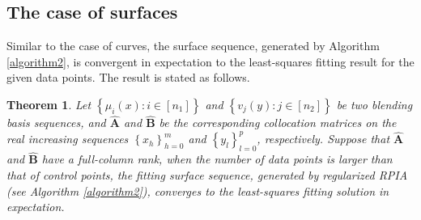 \documentclass[11pt]{article}
\newtheorem{theorem}{Theorem}[section]
\numberwithin{equation}{section}
\begin{document}
\subsection{The case of surfaces}
Similar to the case of curves, the surface sequence, generated by Algorithm \ref{algorithm2}, is convergent in expectation to the least-squares fitting result for the given data points. The result is stated as follows.
\begin{theorem}
Let $\left\{\mu_{i}(x): i \in\left[n_{1}\right]\right\}$ and $\left\{v_{j}(y): j \in\left[n_{2}\right]\right\}$ be two blending basis sequences, and $\hat{\boldsymbol{A}}$ and $\hat{\boldsymbol{B}}$ be the corresponding collocation matrices on the real increasing sequences $\left\{x_{h}\right\}_{h=0}^{m}$ and $\left\{y_{l}\right\}_{l=0}^{p}$, respectively. Suppose that $\hat{\boldsymbol{A}}$ and $\hat{\boldsymbol{B}}$ have a full-column rank, when the number of data points is larger than that of control points, the fitting surface sequence, generated by regularized RPIA (see Algorithm \ref{algorithm2}), converges to the least-squares fitting solution in expectation.
\end{theorem}
\end{document}
